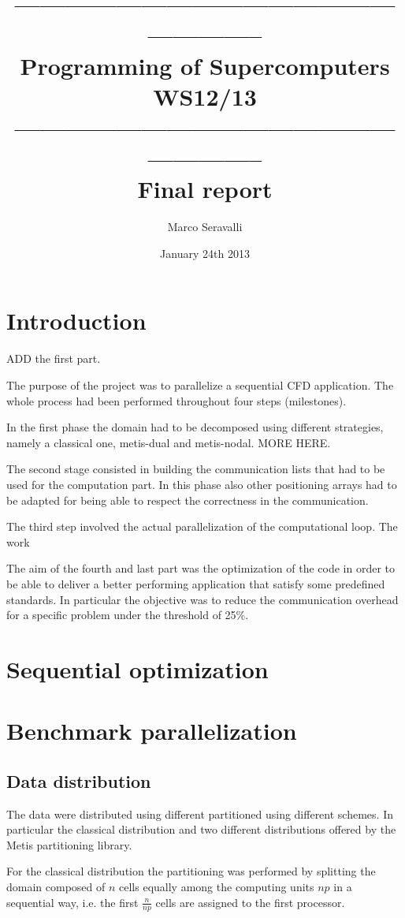 \documentclass[12pt, a4paper]{article}
\title{----------------------------------------------------------- \\
        {\bf Programming of Supercomputers WS12/13}\\ 
        ----------------------------------------------------------- \\ 
        Final report}
\author{Marco Seravalli}
\date{January 24th 2013}
\begin{document}
  \maketitle

\section{Introduction}
ADD the first part.

The purpose of the project was to parallelize a sequential CFD application. The
whole process had been performed throughout four steps (milestones).

In the first phase the domain had to be decomposed using different strategies,
namely a classical one, metis-dual and metis-nodal. 
MORE HERE.

The second stage consisted in building the communication lists that had to be
used for the computation part. In this phase also other positioning arrays had
to be adapted for being able to respect the correctness in the communication.

The third step involved the actual parallelization of the computational loop.
The work

The aim of the fourth and last part was the optimization of the code in order to
be able to deliver a better performing application that satisfy some predefined
standards. In particular the objective was to reduce the communication overhead
for a specific problem under the threshold of 25\%. 

\section{Sequential optimization}

\section{Benchmark parallelization}

  \subsection*{Data distribution}
  The data were distributed using different partitioned using different schemes.
  In particular the classical distribution and two different distributions
  offered by the Metis partitioning library.

  For the classical distribution the partitioning was performed by splitting the
  domain composed of $n$ cells equally among the computing units $np$ in a
  sequential way, i.e. the first $ \frac{n}{np} $ cells are assigned to the
  first processor.
\end{document}
